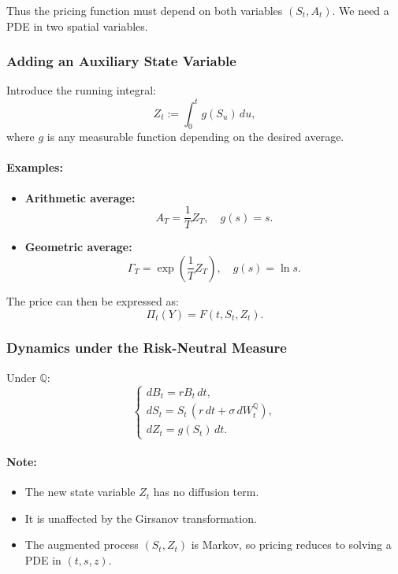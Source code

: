 \documentclass[12pt,a4paper]{article}
\theoremstyle{definition}
\begin{document}
Thus the pricing function must depend on both variables $(S_t, A_t)$. We need a PDE in two spatial variables.

\subsubsection{Adding an Auxiliary State Variable}

Introduce the running integral:
\[
Z_t := \int_0^t g(S_u)\, du,
\]
where $g$ is any measurable function depending on the desired average.

\paragraph{Examples:}

\begin{itemize}
\item \textbf{Arithmetic average:}
\[
A_T = \frac{1}{T} Z_T, \quad g(s) = s.
\]

\item \textbf{Geometric average:}
\[
\Gamma_T = \exp\!\left(\frac{1}{T} Z_T\right), \quad g(s) = \ln s.
\]
\end{itemize}

The price can then be expressed as:
\[
\Pi_t(Y) = F(t, S_t, Z_t).
\]

\subsubsection{Dynamics under the Risk-Neutral Measure}

Under $\mathbb{Q}$:
\[
\begin{cases}
dB_t = r B_t\, dt, \\
dS_t = S_t\, (r\, dt + \sigma\, dW_t^{\mathbb{Q}}), \\
dZ_t = g(S_t)\, dt.
\end{cases}
\]

\paragraph{Note:}
\begin{itemize}
\item The new state variable $Z_t$ has no diffusion term.
\item It is unaffected by the Girsanov transformation.
\item The augmented process $(S_t, Z_t)$ is Markov, so pricing reduces to solving a PDE in $(t, s, z)$.
\end{itemize}
\end{document}
